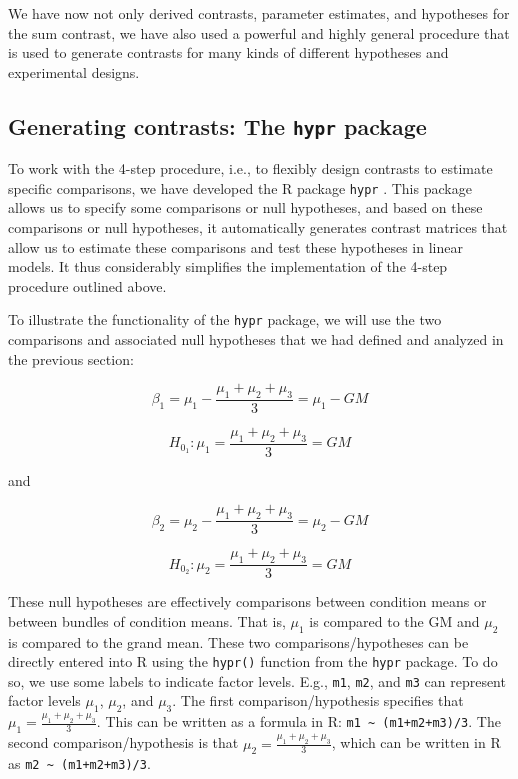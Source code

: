 \documentclass[12pt,]{krantz}
\theoremstyle{definition}
\theoremstyle{definition}
\theoremstyle{definition}
\theoremstyle{remark}
\begin{document}
We have now not only derived contrasts, parameter estimates, and hypotheses for the sum contrast, we have also used a powerful and highly general procedure that is used to generate contrasts for many kinds of different hypotheses and experimental designs.

\hypertarget{generating-contrasts-the-hypr-package}{%
\subsection{\texorpdfstring{Generating contrasts: The \texttt{hypr} package}{Generating contrasts: The hypr package}}\label{generating-contrasts-the-hypr-package}}

To work with the 4-step procedure, i.e., to flexibly design contrasts to estimate specific comparisons, we have developed the R package \texttt{hypr} \citep{rabe2020hypr}. This package allows us to specify some comparisons or null hypotheses, and based on these comparisons or null hypotheses, it automatically generates contrast matrices that allow us to estimate these comparisons and test these hypotheses in linear models. It thus considerably simplifies the implementation of the 4-step procedure outlined above.

To illustrate the functionality of the \texttt{hypr} package, we will use the two comparisons and associated null hypotheses that we had defined and analyzed in the previous section:

\begin{equation}
\beta_1 = \mu_1 - \frac{\mu_1+\mu_2+\mu_3}{3} = \mu_1 - GM
\end{equation}

\begin{equation}
H_{0_1}: \mu_1 = \frac{\mu_1+\mu_2+\mu_3}{3} = GM
\end{equation}

\noindent
and

\begin{equation}
\beta_2 = \mu_2 - \frac{\mu_1+\mu_2+\mu_3}{3} = \mu_2 - GM
\end{equation}

\begin{equation}
H_{0_2}: \mu_2 = \frac{\mu_1+\mu_2+\mu_3}{3} = GM
\end{equation}

These null hypotheses are effectively comparisons between condition means or between bundles of condition means. That is, \(\mu_1\) is compared to the GM and \(\mu_2\) is compared to the grand mean. These two comparisons/hypotheses can be directly entered into R using the \texttt{hypr()} function from the \texttt{hypr} package.
To do so, we use some labels to indicate factor levels. E.g., \texttt{m1}, \texttt{m2}, and \texttt{m3} can represent factor levels \(\mu_1\), \(\mu_2\), and \(\mu_3\). The first comparison/hypothesis specifies that \(\mu_1 = \frac{\mu_1+\mu_2+\mu_3}{3}\). This can be written as a formula in R: \texttt{m1\ \textasciitilde{}\ (m1+m2+m3)/3}. The second comparison/hypothesis is that \(\mu_2 = \frac{\mu_1+\mu_2+\mu_3}{3}\), which can be written in R as \texttt{m2\ \textasciitilde{}\ (m1+m2+m3)/3}.
\end{document}
